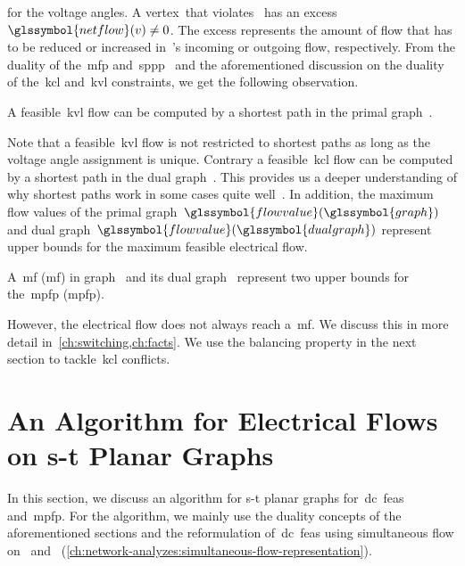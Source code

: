 for the voltage angles.
% 
A vertex~\vertex that
violates~
has an excess~$\glssymbol{netflow}(\vertex)\not= 0$. The excess represents the
amount of flow that has to be reduced or increased in~\vertex's incoming or
outgoing flow, respectively. From the duality of the~\acrlong{mfp}
and~\acrlong{sppp}~\parencite[p.404; Section~3]{For56} and the aforementioned
discussion on the duality of the~\gls{kcl} and~\gls{kvl} constraints, we get the
following observation.
%
\begin{observation}
A feasible~\gls{kvl} flow can be computed by a shortest path in the primal
graph~.
% 
\label{ch:network-analyzes:sec:mathematical-model:lem:KVL-voltage-angles}
\end{observation}
% 
Note that a feasible~\gls{kvl} flow is not restricted to shortest paths as long
as the voltage angle assignment is unique. Contrary a feasible~\gls{kcl} flow
can be computed by a shortest path in the dual graph~. This
provides us a deeper understanding of why shortest paths work in some cases
quite well~\parencite{Gra18}.
% 
In addition, the maximum flow values of the primal
graph~$\glssymbol{flowvalue}(\glssymbol{graph})$ and dual
graph~$\glssymbol{flowvalue}(\glssymbol{dualgraph})$ represent upper bounds for
the maximum feasible electrical flow.
% 
\begin{lemma}%
    A~\acrlong{mf} (\gls{mf}) in graph~ and its dual
    graph~ represent two upper bounds for
    the~\acrlong{mpfp} (\gls{mpfp}).
\end{lemma}%
% 
However, the electrical flow does not always reach a~\gls{mf}. We discuss this
in more detail in~\cref{ch:switching,ch:facts}. 
% 
We use the balancing property in the next section to tackle~\gls{kcl} conflicts.
% 
\section{An Algorithm for Electrical Flows on s-t Planar Graphs}
\label{ch:network-analyzes:sec:algorithm}
% 
In this section, we discuss an algorithm for s-t planar graphs
for~\gls{dc}~\gls{feas} and~\gls{mpfp}. For the algorithm, we mainly use the
duality concepts of the aforementioned sections and the reformulation
of~\gls{dc}~\gls{feas} using simultaneous flow on~
and~
(\cref{ch:network-analyzes:simultaneous-flow-representation}).

